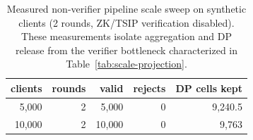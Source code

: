 \begin{table}[t]
\centering
\caption{Measured non-verifier pipeline scale sweep on synthetic clients
(2 rounds, ZK/TSIP verification disabled). These measurements isolate
aggregation and DP release from the verifier bottleneck characterized in
Table~\ref{tab:scale-projection}.}
\label{tab:scale-pipeline}
\scriptsize
\setlength{\tabcolsep}{3pt}
\begin{tabular}{@{}r r r r r@{}}
\toprule
clients & rounds & valid & rejects & DP cells kept \\
\midrule
5{,}000 & 2 & 5{,}000 & 0 & 9{,}240.5 \\
10{,}000 & 2 & 10{,}000 & 0 & 9{,}763 \\
\bottomrule
\end{tabular}
\end{table}
